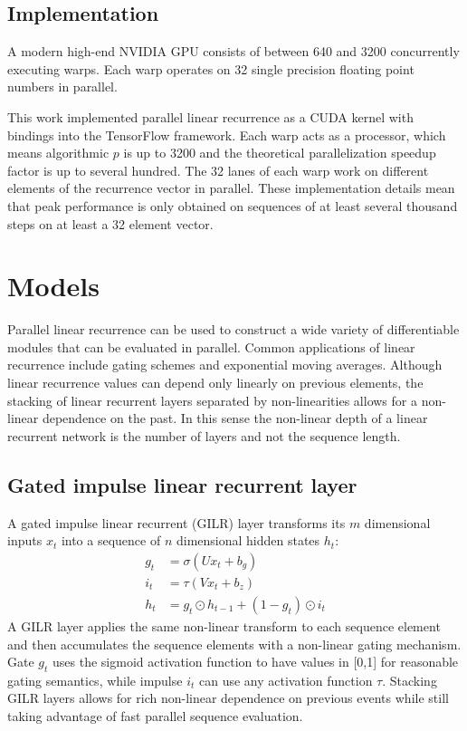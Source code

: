 \documentclass{article}
\begin{document}
\subsection{Implementation}
A modern high-end NVIDIA GPU consists of between 640 and 3200 concurrently
executing warps. Each warp operates on 32 single precision floating point numbers
in parallel.

This work implemented parallel linear recurrence as a CUDA kernel with
bindings into the TensorFlow \cite{abadi2016tensorflow} framework. Each warp acts as a processor, which means algorithmic $p$ is up to 3200 and the theoretical parallelization speedup factor is up to several hundred.
The 32 lanes of each warp work on different
elements of the recurrence vector in parallel. These implementation details mean that
peak performance is only obtained on sequences of at least several thousand
steps on at least a 32 element vector.

\section{Models}
Parallel linear recurrence can be used to construct a wide variety of differentiable modules that can be evaluated in parallel. Common applications of linear recurrence include gating schemes and exponential moving averages. Although linear recurrence values can depend only linearly on previous elements, the stacking of linear recurrent layers separated by non-linearities allows for a non-linear dependence on the past. In this sense the non-linear depth of a linear recurrent network is the number of layers and not the sequence length. 

\subsection{Gated impulse linear recurrent layer}
A gated impulse linear recurrent (GILR) layer transforms its $m$ dimensional inputs $x_t$ into a sequence of $n$ dimensional hidden states $h_t$:
\begin{align*}
g_t &= \sigma(Ux_t + b_g) \\
i_t &= \tau(Vx_t + b_z) \\
h_t &= g_t \odot h_{t-1} + (1-g_t)\odot i_t
\end{align*}
A GILR layer applies the same non-linear transform to each sequence element and then accumulates the sequence elements with a non-linear gating mechanism. Gate $g_t$ uses the sigmoid activation function to have values in [0,1] for reasonable gating semantics, while impulse $i_t$ can use any activation function $\tau$. Stacking GILR layers allows for rich non-linear dependence on previous events while still taking advantage of fast parallel sequence evaluation.
\end{document}
